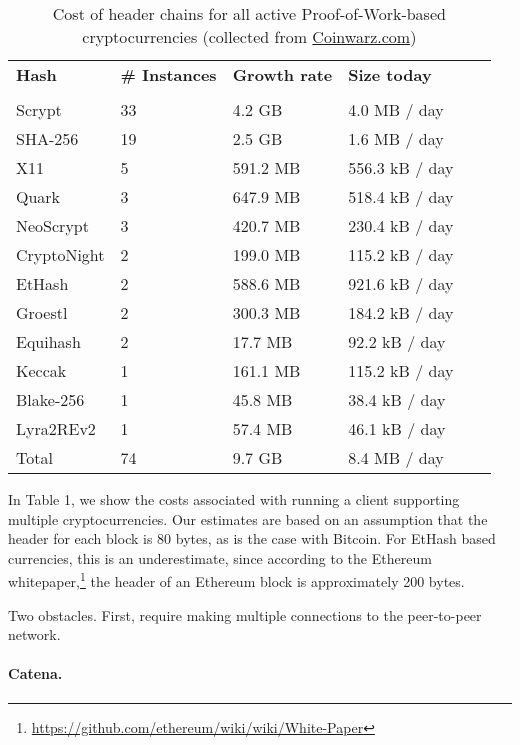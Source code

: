 \begin{table}
  \caption{Cost of header chains for all active Proof-of-Work-based cryptocurrencies (collected from \url{Coinwarz.com})}
\small
  \begin{tabular}{l|ll|ll}
    {\bf Hash} & {\bf \# Instances} & {\bf Growth rate} & {\bf Size today} &  \\\\
    Scrypt  & 33  & 4.2 GB  & 4.0 MB / day \  \\
    SHA-256  & 19  & 2.5 GB  & 1.6 MB / day \  \\
    X11  & 5  & 591.2 MB  & 556.3 kB / day \  \\
    Quark  & 3  & 647.9 MB  & 518.4 kB / day \  \\
    NeoScrypt  & 3  & 420.7 MB  & 230.4 kB / day \  \\
    CryptoNight  & 2  & 199.0 MB  & 115.2 kB / day \  \\
    EtHash  & 2  & 588.6 MB  & 921.6 kB / day \  \\
    Groestl  & 2  & 300.3 MB  & 184.2 kB / day \  \\
    Equihash  & 2  & 17.7 MB  & 92.2 kB / day \  \\
    Keccak  & 1  & 161.1 MB  & 115.2 kB / day \  \\
    Blake-256  & 1  & 45.8 MB  & 38.4 kB / day \  \\
    Lyra2REv2  & 1  & 57.4 MB  & 46.1 kB / day \  \\
    \hline
    Total  & 74   &  9.7 GB  & 8.4 MB  / day  \\
  \end{tabular}
\end{table}

In Table 1, we show the costs associated with running a client supporting multiple cryptocurrencies. Our estimates are based on an assumption that the header for each block is 80 bytes, as is the case with Bitcoin. For EtHash based currencies, this is an underestimate, since according to the Ethereum whitepaper,\footnote{\url{https://github.com/ethereum/wiki/wiki/White-Paper}}
the header of an Ethereum block is approximately 200 bytes.


Two obstacles. First, require making multiple connections to the peer-to-peer network.


\paragraph{Catena.}

